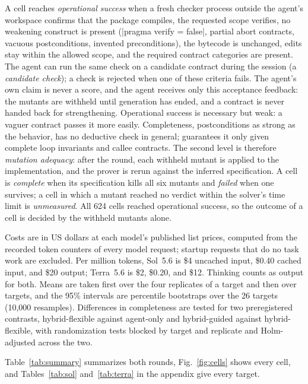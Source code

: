 A cell reaches \emph{operational success} when a fresh checker process outside the agent's workspace confirms that the package compiles, the requested scope verifies, no weakening construct is present (|pragma verify = false|, partial abort contracts, vacuous postconditions, invented preconditions), the bytecode is unchanged, edits stay within the allowed scope, and the required contract categories are present.
The agent can run the same check on a candidate contract during the session (a \emph{candidate check}); a check is rejected when one of these criteria fails.
The agent's own claim is never a score, and the agent receives only this acceptance feedback: the mutants are withheld until generation has ended, and a contract is never handed back for strengthening.
Operational success is necessary but weak: a vaguer contract passes it more easily.
Completeness, postconditions as strong as the behavior, has no deductive check in general; \WP guarantees it only given complete loop invariants and callee contracts.
The second level is therefore \emph{mutation adequacy}: after the round, each withheld mutant is applied to the implementation, and the prover is rerun against the inferred specification.
A cell is \emph{complete} when its specification kills all six mutants and \emph{failed} when one survives; a cell in which a mutant reached no verdict within the solver's time limit is \emph{unmeasured}.
All 624 cells reached operational success, so the outcome of a cell is decided by the withheld mutants alone.

Costs are in US dollars at each model's published list prices, computed from the recorded token counters of every model request; startup requests that do no task work are excluded.
Per million tokens, Sol~5.6 is \$4 uncached input, \$0.40 cached input, and \$20 output; Terra~5.6 is \$2, \$0.20, and \$12.
Thinking counts as output for both.
Means are taken first over the four replicates of a target and then over targets, and the 95\% intervals are percentile bootstraps over the 26 targets (10,000 resamples).
Differences in completeness are tested for two preregistered contrasts, hybrid-flexible against agent-only and hybrid-guided against hybrid-flexible, with randomization tests blocked by target and replicate and Holm-adjusted across the two.

\label{sec:eval-arms}

Table~\ref{tab:summary} summarizes both rounds, Fig.~\ref{fig:cells} shows every cell, and Tables~\ref{tab:sol} and~\ref{tab:terra} in the appendix give every target.

